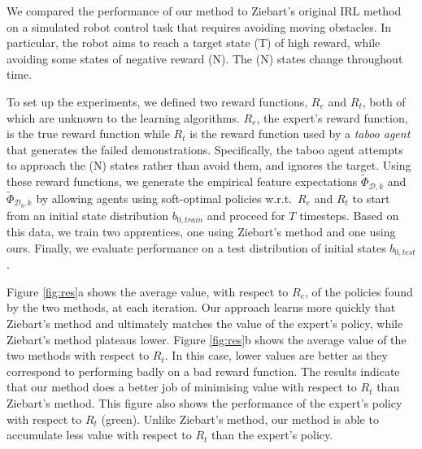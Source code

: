 \documentclass[conference]{IEEEtran}
\begin{document}
We compared the performance of our method to Ziebart's original IRL method on a simulated robot control task that requires avoiding moving obstacles.  In particular, the robot aims to reach a target state (T) of high reward,
while avoiding some states of negative reward (N). The (N) states change throughout time.
 
To set up the experiments, we defined two reward functions, $R_e$ and $R_t$, both of which are unknown to the learning algorithms.  $R_e$, the expert's reward function, is the true reward function while $R_t$ is the reward function used by a \emph{taboo agent} that generates the failed demonstrations. Specifically, the taboo agent attempts to approach the (N) states rather than avoid them, and ignores the target.  Using these reward functions, we generate the empirical feature expectations $\widetilde{\Phi}_{\mathcal{D},k}$ and $\widetilde{\Phi}_{\mathcal{D}_b,k}$ by allowing agents using soft-optimal policies w.r.t.\ $R_e$ and $R_t$ to start from an initial state distribution $b_{0,train}$ and proceed for $T$ timesteps.  Based on this data, we train two apprentices, one using Ziebart's method and one using ours.  Finally, we evaluate performance on a test distribution of initial states $b_{0,test}$. 




Figure \ref{fig:res}a shows the average value, with respect to $R_e$, of the policies found by the two methods, at each iteration.  Our approach learns more quickly that Ziebart's method and  ultimately matches the value of the expert's policy, while Ziebart's method plateaus lower. Figure \ref{fig:res}b shows the average value of the two methods with respect to $R_t$.  In this case, lower values are better as they correspond to performing badly on a bad reward function.  The results indicate that our method does a better job of minimising value with respect to $R_t$ than Ziebart's method.  This figure also shows the performance of the expert's policy with respect to $R_t$ (green). Unlike Ziebart's method, our method is able to accumulate less value with respect to $R_t$ than the expert's policy.
\end{document}
